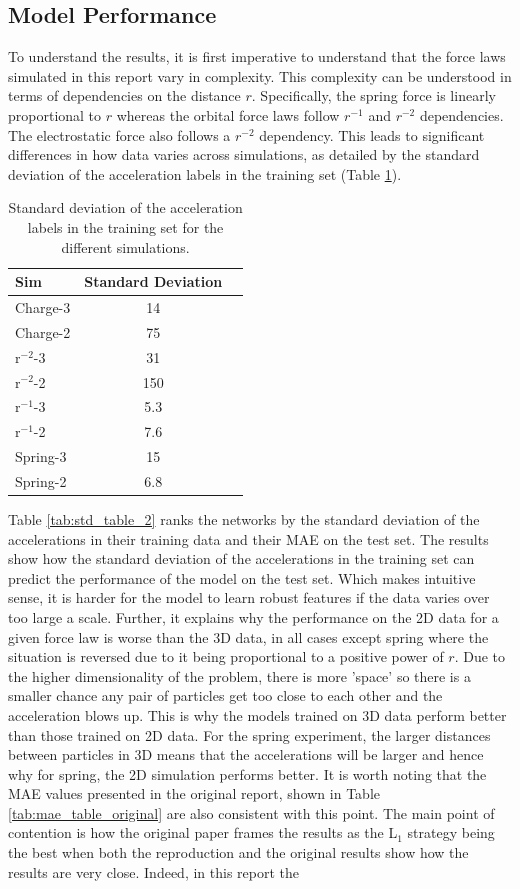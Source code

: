\documentclass[11pt]{article}
\begin{document}
\subsection{Model Performance}
To understand the results, it is first imperative to understand that the force laws simulated in this report vary in complexity. This complexity can be understood in terms of dependencies on the distance \( r \). Specifically, the spring force is linearly proportional to \( r \) whereas the orbital force laws follow \( r^{-1} \) and \( r^{-2} \) dependencies. The electrostatic force also follows a \( r^{-2} \) dependency. This leads to significant differences in how data varies across simulations, as detailed by the standard deviation of the acceleration labels in the training set (Table \ref{tab:std_table}).
\begin{table}[H]
    \centering
    \begin{tabular}{lcc}
    \hline
    Sim & Standard Deviation \\
    \hline
    Charge-3 & 14 \\
    Charge-2 & 75 \\
    r$^{-2}$-3 & 31 \\
    r$^{-2}$-2 & 150 \\
    r$^{-1}$-3 & 5.3 \\
    r$^{-1}$-2 & 7.6 \\
    Spring-3 & 15 \\
    Spring-2 & 6.8 \\
    \hline
    \end{tabular}
    \caption{Standard deviation of the acceleration labels in the training set for the different simulations.}
    \label{tab:std_table}
\end{table}
Table \ref{tab:std_table_2} ranks the networks by the standard deviation of the accelerations in their training data and their MAE on the test set. The results show how the standard deviation of the accelerations in the training set can predict the performance of the model on the test set. Which makes intuitive sense, it is harder for the model to learn robust features if the data varies over too large a scale. Further, it explains why the performance on the 2D data for a given force law is worse than the 3D data, in all cases except spring where the situation is reversed due to it being proportional to a positive power of $r$. Due to the higher dimensionality of the problem, there is more 'space' so there is a smaller chance any pair of particles get too close to each other and the acceleration blows up. This is why the models trained on 3D data perform better than those trained on 2D data. For the spring experiment, the larger distances between particles in 3D means that the accelerations will be larger and hence why for spring, the 2D simulation performs better. It is worth noting that the MAE values presented in the original report, shown in Table \ref{tab:mae_table_original} are also consistent with this point. The main point of contention is how the original paper frames the results as the L$_1$ strategy being the best when both the reproduction and the original results show how the results are very close. Indeed, in this report the
\end{document}
